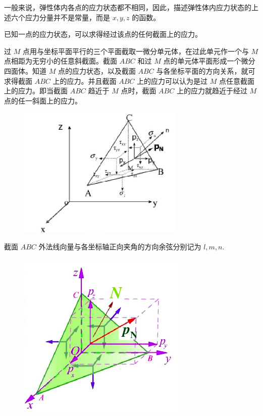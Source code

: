 \documentclass[12pt,a4paper]{article}
\begin{document}
一般来说，弹性体内各点的应力状态都不相同，因此，描述弹性体内应力状态的上述六个应力分量并不是常量，而是 $x,y,z$ 的函数。

已知一点的应力状态，可以求得经过该点的任何截面上的应力。

过 $M$ 点用与坐标平面平行的三个平面截取一微分单元体，在过此单元作一个与 $M$ 点相距为无穷小的任意斜截面。截面 $ABC$ 和过 $M$ 点的单元体平面形成一个微分四面体。知道 $M$ 点的应力状态，以及截面 $ABC$ 与各坐标平面的方向关系，就可求得截面 $ABC$ 上的应力。并且截面 $ABC$ 上的应力可以认为是过 $M$ 点任意截面上的应力。即当截面 $ABC$ 趋近于 $M$ 点时，截面 $ABC$ 上的应力就趋近于经过 $M$ 点的任一斜面上的应力。

\begin{figure}[H]
\centering
\includegraphics[scale=0.5]{./figures/7.png}
\caption{}
\end{figure}

截面 $ABC$ 外法线向量与各坐标轴正向夹角的方向余弦分别记为 $l,m,n$.

\begin{figure}[H]
\centering
\includegraphics[scale=0.5]{./figures/8.png}
\caption{}
\end{figure}
\end{document}
